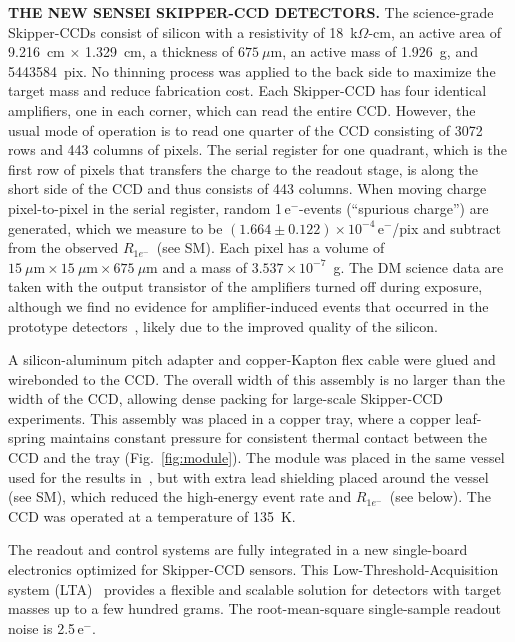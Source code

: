 \documentclass[aps,prl,twocolumn,showpacs,superscriptaddress,preprintnumbers]{revtex4-1}
\newcommand{\unit}[1]{\ensuremath{\mathrm{\,#1}}\xspace}
\newcommand{\e}{\unit{e^{-}}}
\newcommand{\Rs}{$R_{1e^-}$}
\begin{document}
\noindent\textbf{THE NEW SENSEI SKIPPER-CCD DETECTORS.}
The science-grade Skipper-CCDs consist of silicon with a resistivity of 18~k$\Omega$-cm, an active area of 9.216~cm $\times$ 1.329~cm, a thickness of $675~\mu\textrm{m}$, an active mass of 1.926~g, and 5443584~pix. 
No thinning process was applied to the back side to maximize the target mass and reduce fabrication cost.
Each Skipper-CCD has four identical amplifiers, one in each corner, which can read the entire CCD. However, the usual mode of operation is to read one quarter of the CCD consisting of 3072 rows and 443 columns of pixels.
The serial register for one quadrant, which is the first row of pixels that transfers the charge to the readout stage, is along the short side of the CCD and thus consists of 443 columns. 
When moving charge pixel-to-pixel in the serial register, random 1\e-events (``spurious charge'') are generated, which we measure to be $(1.664\pm 0.122)\times 10^{-4}$\e/pix and subtract from the observed \Rs\ (see SM). Each pixel has a volume of $15~\mu\textrm{m} \times 15~\mu\textrm{m} \times 675~\mu\textrm{m}$ and a mass of $3.537\times 10^{-7}$~g. 
The DM science data are taken with the output transistor of the amplifiers turned off during exposure, although we find no evidence for amplifier-induced events that occurred in the prototype detectors~\cite{Abramoff:2019dfb}, likely due to the improved quality of the silicon.  

A silicon-aluminum pitch adapter and copper-Kapton flex cable were glued and wirebonded to the CCD. The overall width of this assembly is 
no larger than the width of the CCD, allowing dense packing for large-scale Skipper-CCD experiments. This assembly was placed in a copper tray, where a copper leaf-spring maintains constant pressure for consistent thermal contact between the CCD and the tray (Fig.~\ref{fig:module}).
The module was placed in the same vessel used for the results in~\cite{Abramoff:2019dfb}, but with extra lead shielding placed around the vessel (see SM), which reduced the high-energy event rate and \Rs\ (see below). The CCD was operated at a temperature of 135~K.

The readout and control systems are fully integrated in a new single-board electronics optimized for Skipper-CCD sensors. This Low-Threshold-Acquisition system (LTA)~\cite{LTA8709274,Cancelo:2020egx} provides a flexible and scalable solution for detectors with target masses up to a few hundred grams. The root-mean-square single-sample readout noise is 2.5\e.
\end{document}
